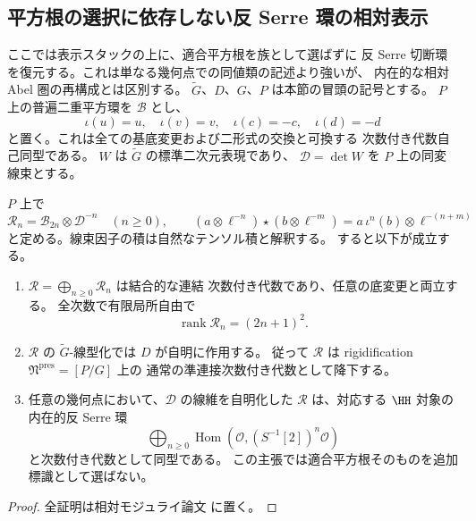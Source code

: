 \subsection{平方根の選択に依存しない反 Serre 環の相対表示}
\label{subsec:noncubic-antiserre-descent}

ここでは表示スタックの上に、適合平方根を族として選ばずに
反 Serre 切断環を復元する。これは単なる幾何点での同値類の記述より強いが、
内在的な相対 Abel 圏の再構成とは区別する。
$\widetilde G$、$D$、$G$、$P$ は本節の冒頭の記号とする。
$P$ 上の普遍二重平方環を $\mathcal B$ とし、
\[
 \iota(u)=u,\quad \iota(v)=v,\quad
 \iota(c)=-c,\quad\iota(d)=-d
\]
と置く。これは全ての基底変更および二形式の交換と可換する
次数付き代数自己同型である。
$W$ は $\widetilde G$ の標準二次元表現であり、
$\mathcal D=\det W$ を $P$ 上の同変線束とする。

\begin{proposition}
\label{prop:noncubic-antiserre-descent}
$P$ 上で
\[
 \mathcal R_n=\mathcal B_{2n}\otimes\mathcal D^{-n}
 \quad(n\ge0),\qquad
 (a\otimes\ell^{-n})\star(b\otimes\ell^{-m})
 =a\,\iota^n(b)\otimes\ell^{-(n+m)}
 \tag{NC-AS}\label{eq:noncubic-antiserre-product}
\]
と定める。線束因子の積は自然なテンソル積と解釈する。
すると以下が成立する。
\begin{enumerate}
\item $\mathcal R=\bigoplus_{n\ge0}\mathcal R_n$ は結合的な連結
  次数付き代数であり、任意の底変更と両立する。
  全次数で有限局所自由で
  \[
    \operatorname{rank}\mathcal R_n=(2n+1)^2.
  \]
\item $\mathcal R$ の $\widetilde G$-線型化では $D$ が自明に作用する。
  従って $\mathcal R$ は rigidification
  $\mathfrak N^{\mathrm{pres}}=[P/G]$ 上の
  通常の準連接次数付き代数として降下する。
\item 任意の幾何点において、$\mathcal D$ の線維を自明化した
  $\mathcal R$ は、対応する $\HH$ 対象の内在的反 Serre 環
  \[
    \bigoplus_{n\ge0}
       \operatorname{Hom}(\mathcal O,(S^{-1}[2])^n\mathcal O)
  \]
  と次数付き代数として同型である。
  この主張では適合平方根そのものを追加標識として選ばない。
\end{enumerate}
\end{proposition}
\begin{proof}
全証明は相対モジュライ論文 \cite[\texttt{noncubic_stack}]{QuadricModuli2026} に置く。
\end{proof}

